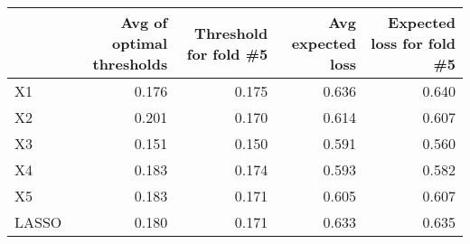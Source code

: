 
\begin{tabular}{lrrrr}
\toprule
  & Avg of optimal thresholds & Threshold for fold \#5 & Avg expected loss & Expected loss for fold \#5\\
\midrule
X1 & 0.176 & 0.175 & 0.636 & 0.640\\
X2 & 0.201 & 0.170 & 0.614 & 0.607\\
X3 & 0.151 & 0.150 & 0.591 & 0.560\\
X4 & 0.183 & 0.174 & 0.593 & 0.582\\
X5 & 0.183 & 0.171 & 0.605 & 0.607\\
LASSO & 0.180 & 0.171 & 0.633 & 0.635\\
\bottomrule
\end{tabular}